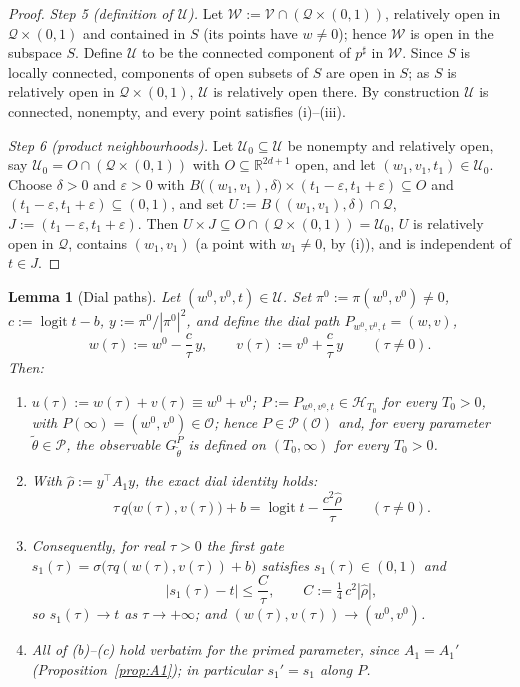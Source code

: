 \documentclass[11pt]{article}
\newtheorem{lemma}[theorem]{Lemma}
\theoremstyle{definition}
\theoremstyle{remark}
\theoremstyle{plain}
\newcommand{\R}{\mathbb{R}}
\newcommand{\cO}{\mathcal{O}}
\newcommand{\cP}{\mathcal{P}}
\newcommand{\cQ}{\mathcal{Q}}
\newcommand{\cU}{\mathcal{U}}
\newcommand{\cH}{\mathcal{H}}
\newcommand{\cV}{\mathcal{V}}
\newcommand{\cW}{\mathcal{W}}
\newcommand{\logit}{\operatorname{logit}}
\newcommand{\sig}{\sigma}
\begin{document}
\begin{proof}
\emph{Step 5 (definition of $\cU$).}  Let $\cW:=\cV\cap(\cQ\times(0,1))$, relatively
open in $\cQ\times(0,1)$ and contained in $S$ (its points have $w\neq0$); hence $\cW$
is open in the subspace $S$.  Define $\cU$ to be the connected component of $p^\sharp$
in $\cW$.  Since $S$ is locally connected, components of open subsets of $S$ are open
in $S$; as $S$ is relatively open in $\cQ\times(0,1)$, $\cU$ is relatively open there.
By construction $\cU$ is connected, nonempty, and every point satisfies (i)--(iii).

\emph{Step 6 (product neighbourhoods).}  Let $\cU_0\subseteq\cU$ be nonempty and
relatively open, say $\cU_0=O\cap(\cQ\times(0,1))$ with $O\subseteq\R^{2d+1}$ open, and
let $(w_1,v_1,t_1)\in\cU_0$.  Choose $\delta>0$ and $\varepsilon>0$ with
$B\big((w_1,v_1),\delta\big)\times(t_1-\varepsilon,t_1+\varepsilon)\subseteq O$ and
$(t_1-\varepsilon,t_1+\varepsilon)\subseteq(0,1)$, and set
$U:=B((w_1,v_1),\delta)\cap\cQ$, $J:=(t_1-\varepsilon,t_1+\varepsilon)$.  Then
$U\times J\subseteq O\cap(\cQ\times(0,1))=\cU_0$, $U$ is relatively open in $\cQ$,
contains $(w_1,v_1)$ (a point with $w_1\neq0$, by (i)), and is independent of $t\in J$.
\end{proof}

\begin{lemma}[Dial paths]\label{lem:dial}
Let $(w^0,v^0,t)\in\cU$.  Set $\pi^0:=\pi(w^0,v^0)\neq0$, $c:=\logit t-b$,
$y:=\pi^0/|\pi^0|^2$, and define the \emph{dial path}
$P_{w^0,v^0,t}=(w,v)$,
\[
w(\tau):=w^0-\frac{c}{\tau}\,y,\qquad v(\tau):=v^0+\frac{c}{\tau}\,y\qquad(\tau\neq0).
\]
Then:
\begin{enumerate}
\item[(a)] $u(\tau):=w(\tau)+v(\tau)\equiv w^0+v^0$;
$P:=P_{w^0,v^0,t}\in\cH_{T_0}$ for every $T_0>0$, with $P(\infty)=(w^0,v^0)\in\cO$;
hence $P\in\cP(\cO)$ and, for every parameter $\widetilde\theta\in\cP$, the observable
$G^P_{\widetilde\theta}$ is defined on $(T_0,\infty)$ for every $T_0>0$.
\item[(b)] With $\hat\rho:=y^\top A_1y$, the exact dial identity holds:
\begin{equation}\label{eq:exactdial}
\tau\,q\big(w(\tau),v(\tau)\big)+b=\logit t-\frac{c^2\hat\rho}{\tau}
\qquad(\tau\neq0).
\end{equation}
\item[(c)] Consequently, for real $\tau>0$ the first gate
$s_1(\tau)=\sig\big(\tau q(w(\tau),v(\tau))+b\big)$ satisfies $s_1(\tau)\in(0,1)$ and
\begin{equation}\label{eq:absorption}
|s_1(\tau)-t|\le\frac{C}{\tau},\qquad C:=\tfrac14\,c^2|\hat\rho|,
\end{equation}
so $s_1(\tau)\to t$ as $\tau\to+\infty$; and $(w(\tau),v(\tau))\to(w^0,v^0)$.
\item[(d)] All of (b)--(c) hold verbatim for the primed parameter, since $A_1=A_1'$
(Proposition~\ref{prop:A1}); in particular $s_1'=s_1$ along $P$.
\end{enumerate}
\end{lemma}
\end{document}
